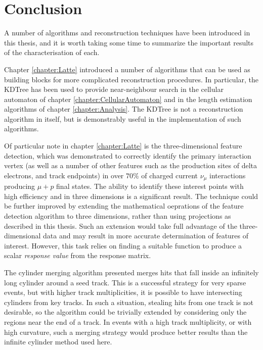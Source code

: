 \chapter{Conclusion}\label{chapter:Conclusion}
A number of algorithms and reconstruction techniques have been introduced in this thesis, and it is worth taking some time to summarize the important results of the characterisation of each.

Chapter \ref{chapter:Latte} introduced a number of algorithms that can be used as building blocks for more complicated reconstruction procedures. In particular, the KDTree has been used to provide near-neighbour search in the cellular automaton of chapter \ref{chapter:CellularAutomaton} and in the length estimation algorithms of chapter \ref{chapter:Analysis}. The KDTree is not a reconstruction algorithm in itself, but is demonstrably useful in the implementation of such algorithms.

Of particular note in chapter \ref{chapter:Latte} is the three-dimensional feature detection, which was demonstrated to correctly identify the primary interaction vertex (as well as a number of other features such as the production sites of delta electrons, and track endpoints) in over $70\%$ of charged current $\nu_\mu$ interactions producing $\mu + p$ final states. The ability to identify these interest points with high efficiency and in three dimensions is a significant result. The technique could be further improved by extending the mathematical oeprations of the feature detection algorithm to three dimensions, rather than using projections as described in this thesis. Such an extension would take full advantage of the three-dimensional data and may result in more accurate determination of features of interest. However, this task relies on finding a suitable function to produce a scalar \emph{response value} from the response matrix.

The cylinder merging algorithm presented merges hits that fall inside an infinitely long cylinder around a seed track. This is a successful strategy for very sparse events, but with higher track multiplicities, it is possible to have intersecting cylinders from key tracks. In such a situation, stealing hits from one track is not desirable, so the algorithm could be trivially extended by considering only the regions near the end of a track. In events with a high track multiplicity, or with high curvature, such a merging strategy would produce better results than the infinite cylinder method used here.

